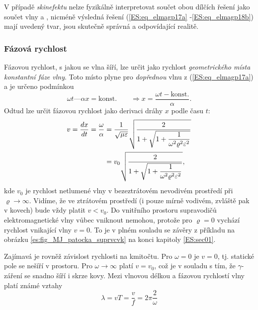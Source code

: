         V případě \emph{skinefektu} nelze fyzikálně interpretovat součet obou dílčích řešení jako 
        součet vlny  a , nicméně výsledná řešení (\ref{ES:eq_elmagp17a} 
        -\ref{ES:eq_elmagp18b}) mají uvedený tvar, jsou skutečně správná a odpovídající realitě.

      \subsubsection{Fázová rychlost}
        Fázovou rychlost, s jakou se vlna šíří, lze určit jako rychlost \emph{geometrického místa 
        konstantní fáze vlny}. Toto místo plyne pro \emph{dopřednou} vlnu z (\ref{ES:eq_elmagp17a}) 
        a je určeno podmínkou
        \begin{equation}\label{ES:eq_elmagp19}
          \omega t—\alpha x = \text{konst.}\qquad\Rightarrow
                          x = \frac{\omega t - \text{konst.}}{\alpha}.
        \end{equation}
        Odtud lze určit fázovou rychlost jako derivaci dráhy \(x\) podle času \(t\):
        \begin{align}\label{ES:eq_elmagp20}
          v  = \dfrac{d x}{d t} = \frac{\omega}{\alpha}
            &= \frac{1}{\sqrt{\mu\varepsilon}}
               \sqrt{\dfrac{2}{1+\sqrt{1+\dfrac{1}{\omega^2\varrho^2\varepsilon^2}}}} \nonumber \\
            &= v_0\sqrt{\dfrac{2}{1+\sqrt{1+\dfrac{1}{\omega^2\varrho^2\varepsilon^2}}}},
        \end{align}
        kde \(v_0\) je rychlost netlumené vlny v bezeztrátovém nevodivém prostředí při \(\varrho 
        \rightarrow\infty\). Vidíme, že ve ztrátovém prostředí (i pouze mírně vodivém, zvláště 
        pak v kovech) bude vždy platit \(v < v_0\). Do vnitřního prostoru supravodičů 
        elektromagnetické vlny vůbec vniknout nemohou, protože pro \(\varrho = 0\) vychází rychlost 
        vnikající vlny \(v = 0\). To je v plném souladu se závěry z příkladu na obrázku 
        \ref{es:fig_MJ_patocka_suprvcvk} na konci kapitoly \ref{ES:sec01}.
        
        Zajímavá je rovněž závislost rychlosti na kmitočtu. Pro \(\omega = 0\) je \(v = 0\), tj. 
        statické pole se nešíří v prostoru. Pro \(\omega\rightarrow\infty\) platí \(v = v_0\), 
        což je v souladu s tím, že \(\gamma\)-záření se snadno šíří i skrze kovy. Mezi vlnovou 
        délkou a fázovou rychlostí vlny platí známé vztahy
        \begin{equation}\label{ES:eq_elmagp21}
          \lambda = vT = \frac{v}{f} = 2\pi\frac{2}{\omega}
        \end{equation}

